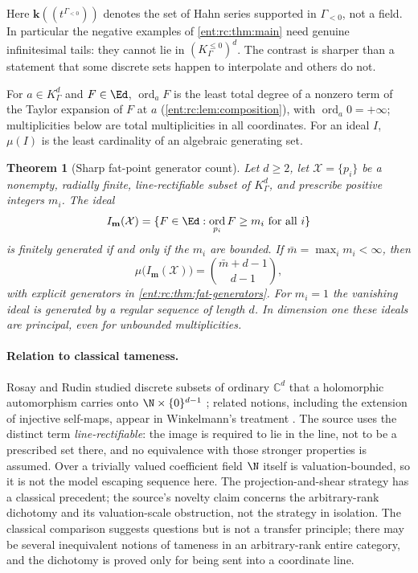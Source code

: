 \documentclass[11pt]{article}
\newtheorem{theorem}{Theorem}[section]
\theoremstyle{plain}
\theoremstyle{plain}
\theoremstyle{plain}
\theoremstyle{definition}
\theoremstyle{definition}
\theoremstyle{definition}
\theoremstyle{definition}
\theoremstyle{remark}
\newcommand{\C}{\mathbb C}\newcommand{\R}{\mathbb R}
\newcommand{\K}{K_\Gamma}\newcommand{\KD}{K_\Delta}
\DeclareMathOperator{\ord}{ord}\DeclareMathOperator{\cf}{cf}
\newcommand{\kk}{\mathbf k}\newcommand{\PP}{\mathbb P}
\newcommand{\Kle}{K_\Gamma^{\le0}}\DeclareMathOperator{\Jac}{Jac}
\begin{document}
Here $\kk((t^{\Gamma_{<0}}))$ denotes the set of Hahn series supported in
$\Gamma_{<0}$, not a field. In particular the negative examples of
\cref{ent:rc:thm:main} need genuine infinitesimal tails: they cannot lie in
$(\Kle)^d$. The contrast is sharper than a statement that some discrete sets
happen to interpolate and others do not.

For $a\in\K^d$ and $F\in\Ed$, $\ord_aF$ is the least total degree of a
nonzero term of the Taylor expansion of $F$ at $a$
(\cref{ent:rc:lem:composition}), with $\ord_a0=+\infty$; multiplicities below
are total multiplicities in all coordinates. For an ideal $I$, $\mu(I)$ is the
least cardinality of an algebraic generating set.

\begin{theorem}[Sharp fat-point generator count]\label{ent:rc:thm:fat-main}
Let $d\ge2$, let $\mathcal X=\{p_i\}$ be a nonempty, radially finite,
line-rectifiable subset of $\K^d$, and prescribe positive integers $m_i$.
The ideal
\[
 I_{\mathbf m}(\mathcal X)=\{F\in\Ed:\ord_{p_i}F\ge m_i\text{ for all }i\}
\]
is finitely generated if and only if the $m_i$ are bounded. If
$\bar m=\max_im_i<\infty$, then
\begin{equation}\label{ent:rc:eq:mu-main}
 \mu\bigl(I_{\mathbf m}(\mathcal X)\bigr)=\binom{\bar m+d-1}{d-1},
\end{equation}
with explicit generators in \cref{ent:rc:thm:fat-generators}. For $m_i=1$
the vanishing ideal is generated by a regular sequence of length $d$. In
dimension one these ideals are principal, even for unbounded multiplicities.
\end{theorem}

\paragraph{Relation to classical tameness.}
Rosay and Rudin studied discrete subsets of ordinary $\C^d$ that a
holomorphic automorphism carries onto $\N\times\{0\}^{d-1}$
\cite{RosayRudin}; related notions, including the extension of injective
self-maps, appear in Winkelmann's treatment \cite{Winkelmann}. The source
uses the distinct term \emph{line-rectifiable}: the image is required to lie
in the line, not to be a prescribed set there, and no equivalence with those
stronger properties is assumed. Over a trivially valued coefficient field
$\N$ itself is valuation-bounded, so it is not the model escaping sequence
here. The projection-and-shear strategy has a classical precedent; the
source's novelty claim concerns the arbitrary-rank dichotomy and its
valuation-scale obstruction, not the strategy in isolation. The classical
comparison suggests questions but is not a transfer principle; there may be
several inequivalent notions of tameness in an arbitrary-rank entire
category, and the dichotomy is proved only for being sent into a coordinate
line.
\end{document}
